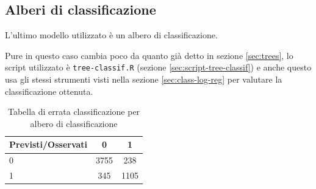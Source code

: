 \subsection{Alberi di classificazione}\label{sec:class-tree}

L'ultimo modello utilizzato è un albero di classificazione.

Pure in questo caso cambia poco da quanto già detto in sezione
\ref{sec:trees}, lo script utilizzato è \texttt{tree-classif.R} (sezione
\ref{sec:script-tree-classif}) e anche questo usa gli stessi strumenti visti
nella sezione \ref{sec:class-log-reg} per valutare la classificazione ottenuta.

\begin{table}[H]
\begin{center}
\begin{tabular}{ | l || c | c | }
  \hline
    Previsti/Osservati & 0 & 1 \\ \hline \hline
    0 & 3755 & 238 \\ \hline
    1 & 345 & 1105 \\ \hline
\end{tabular}
  \caption{Tabella di errata classificazione per albero di classificazione}
\end{center}
\end{table}

